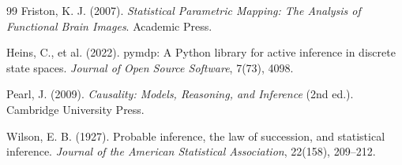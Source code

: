 \documentclass[12pt,a4paper]{report}
\begin{document}
\begin{thebibliography}{99}
Friston, K. J. (2007).
\textit{Statistical Parametric Mapping: The Analysis of Functional Brain Images}.
Academic Press.

Heins, C., et al. (2022).
pymdp: A Python library for active inference in discrete state spaces.
\textit{Journal of Open Source Software}, 7(73), 4098.

Pearl, J. (2009).
\textit{Causality: Models, Reasoning, and Inference} (2nd ed.).
Cambridge University Press.

Wilson, E. B. (1927).
Probable inference, the law of succession, and statistical inference.
\textit{Journal of the American Statistical Association}, 22(158), 209--212.

\end{thebibliography}
\end{document}
